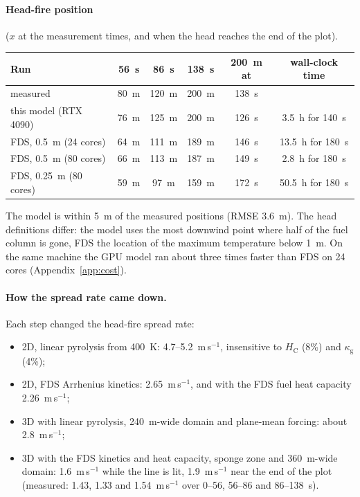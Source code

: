 \documentclass[11pt,a4paper]{article}
\begin{document}
\paragraph{Head-fire position} ($x$ at the measurement times, and when the head reaches the end of the plot).
\begin{center}
\small
\begin{tabular}{lccccc}
\toprule
Run & 56~s & 86~s & 138~s & 200~m at & wall-clock time \\
\midrule
measured & 80~m & 120~m & 200~m & 138~s & \\
this model (RTX 4090) & 76~m & 125~m & 200~m & 126~s & 3.5~h for 140~s \\
FDS, 0.5~m (24 cores) & 64~m & 111~m & 189~m & 146~s & 13.5~h for 180~s \\
FDS, 0.5~m (80 cores) & 66~m & 113~m & 187~m & 149~s & 2.8~h for 180~s \\
FDS, 0.25~m (80 cores) & 59~m & 97~m & 159~m & 172~s & 50.5~h for 180~s \\
\bottomrule
\end{tabular}
\end{center}
The model is within 5~m of the measured positions (RMSE 3.6~m). The head definitions differ: the model uses
the most downwind point where half of the fuel column is gone, FDS the location of the maximum temperature
below 1~m. On the same machine the GPU model ran about three times faster than FDS on 24 cores
(Appendix~\ref{app:cost}).

\paragraph{How the spread rate came down.} Each step changed the head-fire spread rate:
\begin{itemize}
  \item 2D, linear pyrolysis from 400~K: 4.7--5.2~m\,s$^{-1}$, insensitive to $H_\text{C}$ (8\%) and $\kappa_\text{g}$ (4\%);
  \item 2D, FDS Arrhenius kinetics: 2.65~m\,s$^{-1}$, and with the FDS fuel heat capacity 2.26~m\,s$^{-1}$;
  \item 3D with linear pyrolysis, 240~m-wide domain and plane-mean forcing: about 2.8~m\,s$^{-1}$;
  \item 3D with the FDS kinetics and heat capacity, sponge zone and 360~m-wide domain: 1.6~m\,s$^{-1}$
        while the line is lit, 1.9~m\,s$^{-1}$ near the end of the plot (measured: 1.43, 1.33 and
        1.54~m\,s$^{-1}$ over 0--56, 56--86 and 86--138~s).
\end{itemize}
\end{document}
